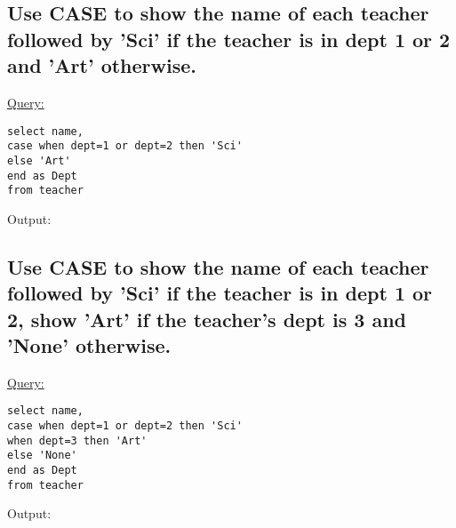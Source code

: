 \documentclass[a4paper,11pt]{article}
\begin{document}
\subsection{Use CASE to show the name of each teacher followed by 'Sci' if the teacher is in dept 1 or 2 and 'Art' otherwise.}
\underline{Query:}
\begin{lstlisting}[showstringspaces=false]
select name,
case when dept=1 or dept=2 then 'Sci'
else 'Art'
end as Dept
from teacher
\end{lstlisting}
Output:
\begin{figure}[H]
\centering
{}
\end{figure}
\smallskip

\subsection{Use CASE to show the name of each teacher followed by 'Sci' if the teacher is in dept 1 or 2, show 'Art' if the teacher's dept is 3 and 'None' otherwise.}
\underline{Query:}
\begin{lstlisting}[showstringspaces=false]
select name,
case when dept=1 or dept=2 then 'Sci'
when dept=3 then 'Art'
else 'None'
end as Dept
from teacher
\end{lstlisting}
Output:
\begin{figure}[H]
\centering
{}
\end{figure}
\end{document}
